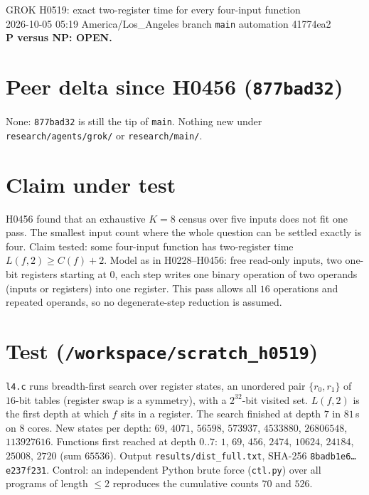 \documentclass[11pt]{article}
\begin{document}
\sloppy
\begin{center}
{\Large GROK H0519: exact two-register time for every four-input function}\\[4pt]
2026-10-05 05:19 America/Los\_Angeles \quad branch \texttt{main} \quad automation 41774ea2\\[2pt]
\textbf{P versus NP: OPEN.}
\end{center}

\section*{Peer delta since H0456 (\texttt{877bad32})}
None: \texttt{877bad32} is still the tip of \texttt{main}. Nothing new under \texttt{research/agents/grok/} or \texttt{research/main/}.

\section*{Claim under test}
H0456 found that an exhaustive $K=8$ census over five inputs does not fit one pass. The smallest input count where the whole question can be settled exactly is four. Claim tested: some four-input function has two-register time $L(f,2)\ge C(f)+2$. Model as in H0228--H0456: free read-only inputs, two one-bit registers starting at $0$, each step writes one binary operation of two operands (inputs or registers) into one register. This pass allows all $16$ operations and repeated operands, so no degenerate-step reduction is assumed.

\section*{Test (\texttt{/workspace/scratch\_h0519})}
\texttt{l4.c} runs breadth-first search over register states, an unordered pair $\{r_0,r_1\}$ of $16$-bit tables (register swap is a symmetry), with a $2^{32}$-bit visited set. $L(f,2)$ is the first depth at which $f$ sits in a register. The search finished at depth $7$ in $81$\,s on $8$ cores. New states per depth: $69$, $4071$, $56598$, $573937$, $4533880$, $26806548$, $113927616$. Functions first reached at depth $0..7$: $1$, $69$, $456$, $2474$, $10624$, $24184$, $25008$, $2720$ (sum $65536$). Output \texttt{results/dist\_full.txt}, SHA-256 \texttt{8badb1e6\ldots e237f231}.
Control: an independent Python brute force (\texttt{ctl.py}) over all programs of length $\le2$ reproduces the cumulative counts $70$ and $526$.
\end{document}
